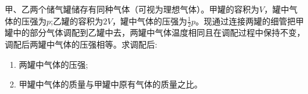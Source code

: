 甲、乙两个储气罐储存有同种气体（可视为理想气体）。甲罐的容积为\(V\)，罐中气体的压强为\(p\);乙罐的容积为\(2V\)，罐中气体的压强为\(\frac{1}{2}p\)。现通过连接两罐的细管把甲罐中的部分气体调配到乙罐中去，两罐中气体温度相同且在调配过程中保持不变，调配后两罐中气体的压强相等。求调配后:
\begin{enumerate}[(1)]
    \item 两罐中气体的压强;
    \item 甲罐中气体的质量与甲罐中原有气体的质量之比。
\end{enumerate}